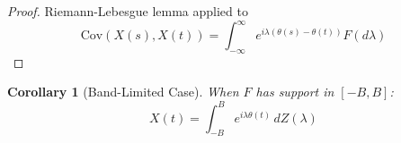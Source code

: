 \documentclass[11pt]{article}
\newtheorem{corollary}{Corollary}
\begin{document}
\begin{proof}
Riemann-Lebesgue lemma applied to
\begin{equation}
\text{Cov}(X(s),X(t)) = \int_{-\infty}^{\infty} e^{i\lambda(\theta(s)-\theta(t))} F(d\lambda)
\end{equation}
\end{proof}

\begin{corollary}[Band-Limited Case]
When $F$ has support in $[-B,B]$:
\begin{equation}
X(t) = \int_{-B}^B e^{i\lambda\theta(t)} \, dZ(\lambda)
\end{equation}
\end{corollary}
\end{document}
